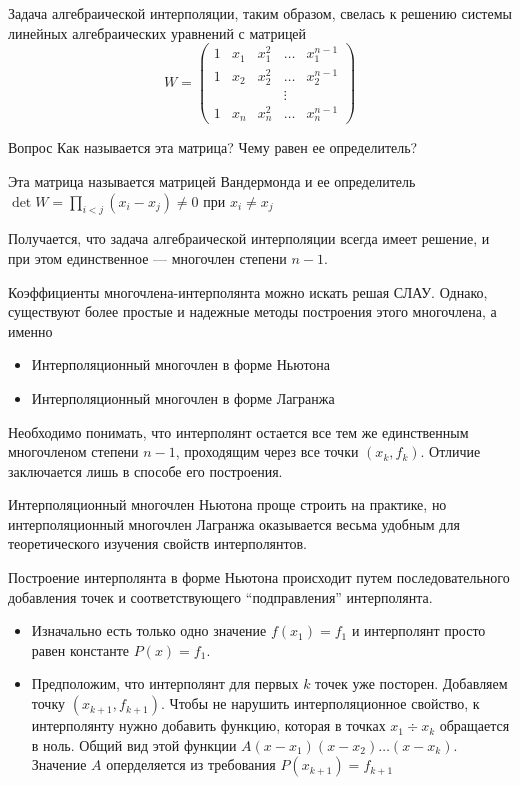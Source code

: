 \documentclass[professionalfonts,compress,unicode]{beamer}
\begin{document}
{
	Задача алгебраической интерполяции, таким образом, свелась
	к решению системы линейных алгебраических уравнений с матрицей 
	$$
	W = \left(
	\begin{array}{ccccc}
		1&x_1&x_1^2& \dots & x_1^{n-1}\\
		1&x_2&x_2^2& \dots & x_2^{n-1}\\
		&&&\vdots\\
		1&x_n&x_n^2& \dots & x_n^{n-1}
	\end{array}
	\right)
	$$
	\begin{block}{Вопрос}
		Как называется эта матрица? Чему равен ее определитель?
		\pause
		
		Эта матрица называется матрицей Вандермонда и ее определитель $\det W ={\prod}_{i<j}  (x_i-x_j) \neq 0$ при $x_i \neq x_j$
	\end{block}
	Получается, что задача алгебраической интерполяции всегда имеет решение, и при этом единственное --- многочлен степени $n-1$. 
}

{
	Коэффициенты многочлена-интерполянта можно искать решая СЛАУ. Однако, существуют более
	простые и надежные методы построения этого многочлена, а именно
	\begin{itemize}
		\item Интерполяционный многочлен в форме Ньютона
		\item Интерполяционный многочлен в форме Лагранжа
	\end{itemize}
	\pause
	
	Необходимо понимать, что интерполянт остается все тем же единственным многочленом степени $n-1$, 
	проходящим через все точки $(x_k, f_k)$. Отличие заключается лишь в способе его построения.
	\pause
	
	Интерполяционный многочлен Ньютона проще строить на практике, но интерполяционный многочлен Лагранжа
	оказывается весьма удобным для теоретического изучения свойств интерполянтов.
}

{
	Построение интерполянта в форме Ньютона происходит путем последовательного добавления точек и 
	соответствующего ``подправления'' интерполянта.
	\begin{itemize}
	\pause
	\item Изначально есть только одно значение $f(x_1) = f_1$ и интерполянт просто равен константе $P(x) = f_1$.
	\pause
	\item Предположим, что интерполянт для первых $k$ точек уже посторен. Добавляем точку $(x_{k+1}, f_{k+1})$. 
	Чтобы не нарушить интерполяционное свойство, к интерполянту нужно добавить функцию, которая в точках $x_1 \div x_k$ обращается в ноль.
	Общий вид этой функции $A(x-x_1)(x-x_2)\dots(x-x_k)$. Значение $A$ оперделяется из требования $P(x_{k+1}) = f_{k+1}$
	\end{itemize}
}
\end{document}

